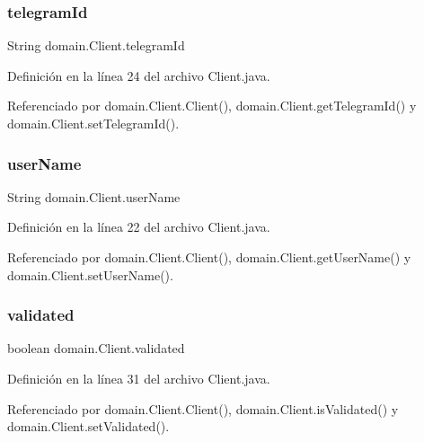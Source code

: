 \subsubsection{\texorpdfstring{telegramId}{telegramId}}
{\footnotesize\ttfamily String domain.\+Client.\+telegram\+Id\hspace{0.3cm}{\ttfamily [private]}}



Definición en la línea 24 del archivo Client.\+java.



Referenciado por domain.\+Client.\+Client(), domain.\+Client.\+get\+Telegram\+Id() y domain.\+Client.\+set\+Telegram\+Id().

\mbox{\label{classdomain_1_1_client_a759c4fe989503ceb29bcefca63177186}} 
\subsubsection{\texorpdfstring{userName}{userName}}
{\footnotesize\ttfamily String domain.\+Client.\+user\+Name\hspace{0.3cm}{\ttfamily [private]}}



Definición en la línea 22 del archivo Client.\+java.



Referenciado por domain.\+Client.\+Client(), domain.\+Client.\+get\+User\+Name() y domain.\+Client.\+set\+User\+Name().

\mbox{\label{classdomain_1_1_client_a2e70a563bf23fd2be7adc13e997363c8}} 
\subsubsection{\texorpdfstring{validated}{validated}}
{\footnotesize\ttfamily boolean domain.\+Client.\+validated\hspace{0.3cm}{\ttfamily [private]}}



Definición en la línea 31 del archivo Client.\+java.



Referenciado por domain.\+Client.\+Client(), domain.\+Client.\+is\+Validated() y domain.\+Client.\+set\+Validated().


